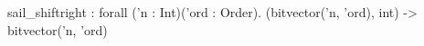 sail_shiftright : forall ('n : Int)('ord : Order). (bitvector('n, 'ord), int) -> bitvector('n, 'ord)